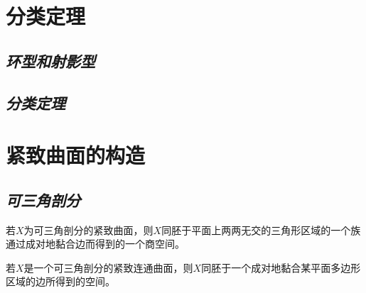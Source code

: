 \section{分类定理}

\subsection*{\textsl{环型和射影型}}

\subsection*{\textsl{分类定理}}

\section{紧致曲面的构造}

\subsection*{\textsl{可三角剖分}}

\begin{mdframed}
    \begin{theorem}
        若$X$为可三角剖分的紧致曲面，则$X$同胚于平面上两两无交的三角形区域的一个族通过成对地黏合边而得到的一个商空间。
    \end{theorem}
\end{mdframed}

\begin{mdframed}
    \begin{theorem}
        若$X$是一个可三角剖分的紧致连通曲面，则$X$同胚于一个成对地黏合某平面多边形区域的边所得到的空间。
    \end{theorem}
\end{mdframed}